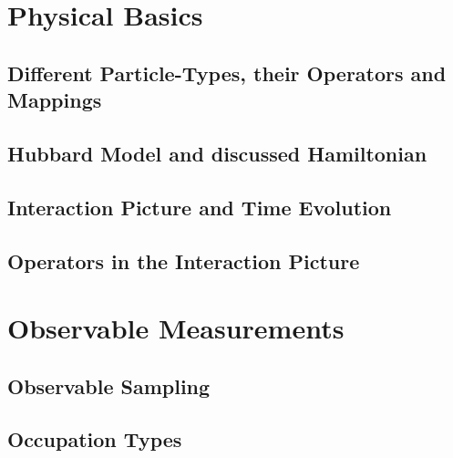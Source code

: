 \documentclass[
headings=optiontohead,              %
12pt,                               %
DIV=13,                             %
twoside=false,                      %
open=right,                         %
BCOR=00mm,                          %
toc=bibliographynumbered            %
]{scrreport}
\begin{document}
    \section{Physical Basics}
    \label{sec:theory-physics}
    
    \FloatBarrier
        \subsection{Different Particle-Types, their Operators and Mappings}
        \label{sec:particles}
        
        \FloatBarrier

        \subsection{Hubbard Model and discussed Hamiltonian}
        \label{sec:theory-hubbard-hamiltonian}
        
        \FloatBarrier

        
        \subsection{Interaction Picture and Time Evolution}
        \label{sec:theory-interaction-picture}
        
        \FloatBarrier
        
        \subsection{Operators in the Interaction Picture}
        \label{sec:theory-approximation-evaluation}
        
        \FloatBarrier

    \section{Observable Measurements}
    \label{sec:theory-observables}
    
    \FloatBarrier

        \subsection{Observable Sampling}
        \label{sec:theory-observables-sampling}
        
        \FloatBarrier

        \subsection{Occupation Types}
        \label{sec:theory-observables-occupations}
        
        \FloatBarrier
\end{document}
